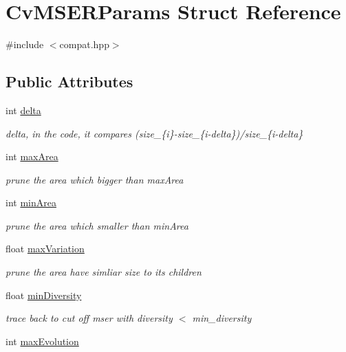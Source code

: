 \hypertarget{structCvMSERParams}{\section{Cv\-M\-S\-E\-R\-Params Struct Reference}
\label{structCvMSERParams}
}


{\ttfamily \#include $<$compat.\-hpp$>$}

\subsection*{Public Attributes}
\begin{DoxyCompactItemize}
\item 
int \hyperlink{structCvMSERParams_a9a8574af934f1efe0aacb610fd273f04}{delta}
\begin{DoxyCompactList}\small\item\em delta, in the code, it compares (size\-\_\-\{i\}-\/size\-\_\-\{i-\/delta\})/size\-\_\-\{i-\/delta\} \end{DoxyCompactList}\item 
int \hyperlink{structCvMSERParams_a4f2be25b22dd08ebf741240d9b5a445e}{max\-Area}
\begin{DoxyCompactList}\small\item\em prune the area which bigger than max\-Area \end{DoxyCompactList}\item 
int \hyperlink{structCvMSERParams_aa05b341d994d1fd85e199f5c4fe41db0}{min\-Area}
\begin{DoxyCompactList}\small\item\em prune the area which smaller than min\-Area \end{DoxyCompactList}\item 
float \hyperlink{structCvMSERParams_acb769f970c8804c122db9c5dbbc9a37d}{max\-Variation}
\begin{DoxyCompactList}\small\item\em prune the area have simliar size to its children \end{DoxyCompactList}\item 
float \hyperlink{structCvMSERParams_addc1cf6caebd85fa2eee45be5cafe613}{min\-Diversity}
\begin{DoxyCompactList}\small\item\em trace back to cut off mser with diversity $<$ min\-\_\-diversity \end{DoxyCompactList}\item 
int \hyperlink{structCvMSERParams_ae2c65c573f5749809ae5cf426a4bd311}{max\-Evolution}

\end{DoxyCompactItemize}
